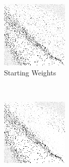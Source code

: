 
\begin{figure}
\center

	\begin{subfigure}[t]{0.3\textwidth}
	\includegraphics[width=\textwidth]{images/findings/round2/flipbook/winner/checkpoint_000000.png}
	\caption{Starting Weights}
	\end{subfigure}
	~
	\begin{subfigure}[t]{0.3\textwidth}
	\includegraphics[width=\textwidth]{images/findings/round2/flipbook/winner/checkpoint_200000.png}

\end{subfigure}
\end{figure}
